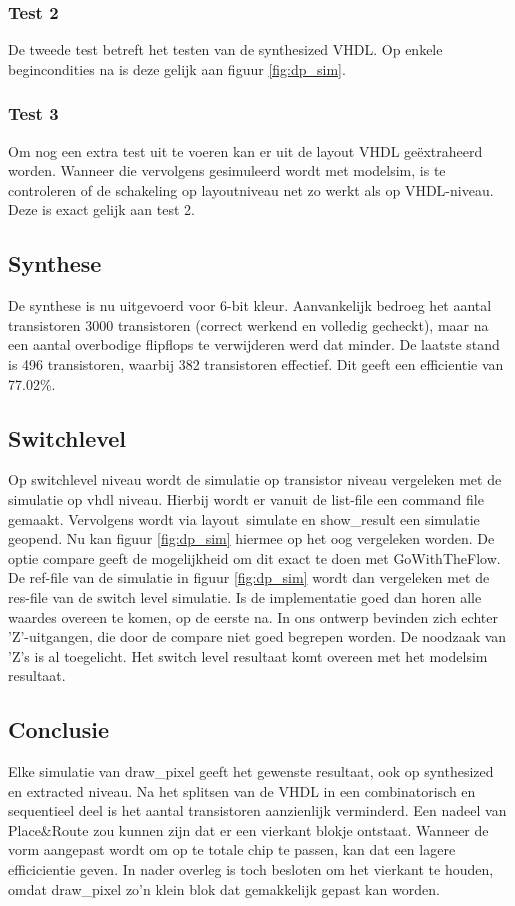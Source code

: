 \documentclass{scrartcl} %
\begin{document}
\subsubsection{Test 2}
De tweede test betreft het testen van de synthesized VHDL. Op enkele begincondities na is deze gelijk aan  figuur \ref{fig:dp_sim}. 

\subsubsection{Test 3}
Om nog een extra test uit te voeren kan er uit de layout VHDL geëxtraheerd worden. Wanneer die vervolgens gesimuleerd wordt met modelsim, is te controleren of de schakeling op layoutniveau net zo werkt als op VHDL-niveau. Deze is exact gelijk aan test 2. 
\subsection{Synthese}
De synthese is nu uitgevoerd voor 6-bit kleur. Aanvankelijk bedroeg het aantal transistoren 3000 transistoren (correct werkend en volledig gecheckt), maar na een aantal overbodige flipflops te verwijderen werd dat minder. De laatste stand is 496 transistoren, waarbij 382 transistoren effectief. Dit geeft een efficientie van 77.02\%. 

\subsection{Switchlevel}
Op switchlevel niveau wordt de simulatie op transistor niveau vergeleken met de simulatie op vhdl niveau. Hierbij wordt er vanuit de list-file een command file gemaakt. Vervolgens wordt via layout\ simulate en show\_result een simulatie geopend. Nu kan figuur \ref{fig:dp_sim} hiermee op het oog vergeleken worden. De optie compare geeft de mogelijkheid om dit exact te doen met GoWithTheFlow. De ref-file van de simulatie in figuur \ref{fig:dp_sim} wordt dan vergeleken met de res-file van de switch level simulatie. Is de implementatie goed dan horen alle waardes overeen te komen, op de eerste na. In ons ontwerp bevinden zich echter 'Z'-uitgangen, die door de compare niet goed begrepen worden. De noodzaak van 'Z's is al toegelicht. Het switch level resultaat komt overeen met het modelsim resultaat. 


\subsection{Conclusie}
Elke simulatie van draw\_pixel geeft het gewenste resultaat, ook op synthesized en extracted niveau. Na het splitsen van de VHDL in een combinatorisch en sequentieel deel is het aantal transistoren aanzienlijk verminderd. Een nadeel van Place\&Route zou kunnen zijn dat er een vierkant blokje ontstaat. Wanneer de vorm aangepast wordt om op te totale chip te passen, kan dat een lagere efficicientie geven. In nader overleg is toch besloten om het vierkant te houden, omdat draw\_pixel zo'n klein blok dat gemakkelijk gepast kan worden. 
\end{document}
